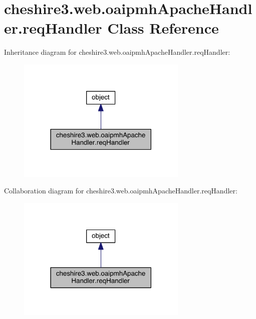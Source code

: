 \hypertarget{classcheshire3_1_1web_1_1oaipmh_apache_handler_1_1req_handler}{\section{cheshire3.\-web.\-oaipmh\-Apache\-Handler.\-req\-Handler Class Reference}
\label{classcheshire3_1_1web_1_1oaipmh_apache_handler_1_1req_handler}
}


Inheritance diagram for cheshire3.\-web.\-oaipmh\-Apache\-Handler.\-req\-Handler\-:
\nopagebreak
\begin{figure}[H]
\begin{center}
\leavevmode
\includegraphics[width=230pt]{classcheshire3_1_1web_1_1oaipmh_apache_handler_1_1req_handler__inherit__graph}
\end{center}
\end{figure}


Collaboration diagram for cheshire3.\-web.\-oaipmh\-Apache\-Handler.\-req\-Handler\-:
\nopagebreak
\begin{figure}[H]
\begin{center}
\leavevmode
\includegraphics[width=230pt]{classcheshire3_1_1web_1_1oaipmh_apache_handler_1_1req_handler__coll__graph}
\end{center}
\end{figure}
